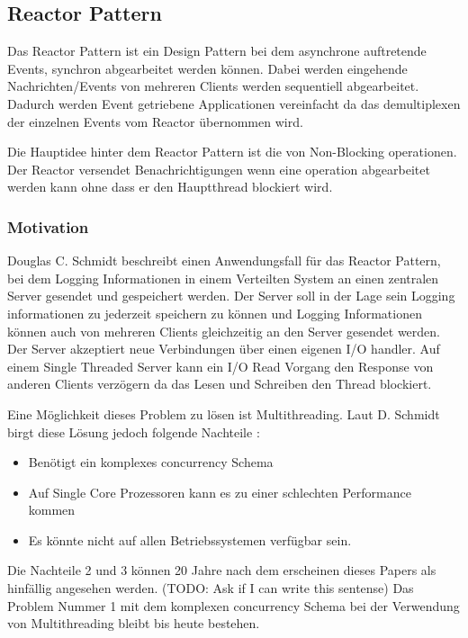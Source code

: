 \subsection{Reactor Pattern}
\label{section:Reactor Pattern}

Das Reactor Pattern ist ein Design Pattern bei dem asynchrone auftretende Events, synchron abgearbeitet werden können. Dabei werden eingehende Nachrichten/Events von mehreren Clients werden sequentiell abgearbeitet. Dadurch werden Event getriebene Applicationen vereinfacht da das demultiplexen der einzelnen Events vom Reactor übernommen wird. \cite[p. 1]{Sch95}

Die Hauptidee hinter dem Reactor Pattern ist die von Non-Blocking operationen. Der Reactor versendet Benachrichtigungen wenn eine operation abgearbeitet werden kann ohne dass er den Hauptthread blockiert wird.


\subsubsection{Motivation}

Douglas C. Schmidt beschreibt einen Anwendungsfall für das Reactor Pattern, bei dem Logging Informationen in einem Verteilten System an einen zentralen Server gesendet und gespeichert werden. Der Server soll in der Lage sein Logging informationen zu jederzeit speichern zu können und Logging Informationen können auch von mehreren Clients gleichzeitig an den Server gesendet werden. Der Server akzeptiert neue Verbindungen über einen eigenen I/O handler. Auf einem Single Threaded Server kann ein I/O Read Vorgang den Response von anderen Clients verzögern da das Lesen und Schreiben den Thread blockiert. \cite[p. 1]{Sch95}

Eine Möglichkeit dieses Problem zu lösen ist Multithreading. Laut D. Schmidt birgt diese Lösung jedoch folgende Nachteile \cite[p. 2]{Sch95}:

\begin{itemize}
  \item Benötigt ein komplexes concurrency Schema
  \item Auf Single Core Prozessoren kann es zu einer schlechten Performance kommen
  \item Es könnte nicht auf allen Betriebssystemen verfügbar sein. 
\end{itemize}

Die Nachteile 2 und 3 können 20 Jahre nach dem erscheinen dieses Papers als hinfällig angesehen werden. (TODO: Ask if I can write this sentense) Das Problem Nummer 1 mit dem komplexen concurrency Schema bei der Verwendung von Multithreading bleibt bis heute bestehen. 


